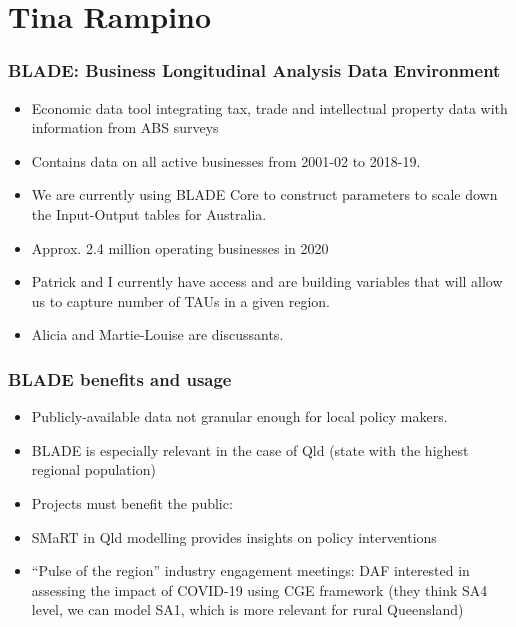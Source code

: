 \documentclass[handout,english]{beamer}
\begin{document}
\section{Tina Rampino}
\begin{frame}\small
  \frametitle{BLADE: \small 	Business Longitudinal Analysis Data Environment} 
  \begin{itemize}
    \item Economic data tool integrating tax, trade and intellectual property data 
  with information from ABS surveys
    
   \item Contains data on all active businesses from 2001-02 to 2018-19.
	
   \item We are currently using BLADE Core to construct parameters to scale down
  the Input-Output tables for Australia.

   \item Approx. 2.4 million operating businesses in 2020
  
   \item Patrick and I currently have access and are building 
  variables that will allow us to capture number of TAUs in a given region.

   \item Alicia and Martie-Louise are discussants.
\end{itemize}
\end{frame}
\begin{frame}\small
  \frametitle{BLADE benefits and usage}
\begin{itemize}
	  \item Publicly-available data not granular enough for local policy makers. 
	  \item BLADE is especially relevant in the case of Qld (state with the highest regional population)
	  \item Projects must benefit the public:
	  \item SMaRT in Qld modelling provides insights on policy interventions
	  \item “Pulse of the region” industry engagement meetings: DAF interested in assessing the impact of COVID-19 using CGE framework (they think SA4 level, we can model SA1, which is more relevant for rural Queensland)
  \end{itemize}
\end{frame}
\end{document}

